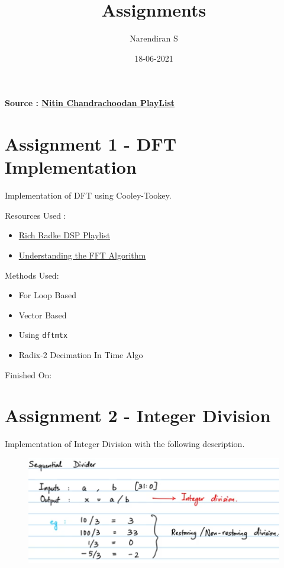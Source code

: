 \documentclass{article}
\title{Assignments}
\author{Narendiran S}
\begin{document}
\Large
\maketitle
\textbf{Source : \href{https://youtube.com/playlist?list=PLco7dux9L7g1RrB8TqUVCMEeu86D7azeg}{Nitin Chandrachoodan PlayList}}

\section{Assignment 1 - DFT Implementation}
Implementation of DFT using Cooley-Tookey.


Resources Used :
\begin{itemize}
    \item \href{https://youtube.com/playlist?list=PLuh62Q4Sv7BUSzx5Jr8Wrxxn-U10qG1et}{Rich Radke DSP Playlist}
    \item \href{https://jakevdp.github.io/blog/2013/08/28/understanding-the-fft/}{Understanding the FFT Algorithm}
\end{itemize}


Methods Used:
\begin{itemize}
    \item For Loop Based
    \item Vector Based
    \item Using \verb|dftmtx|
    \item Radix-2 Decimation In Time Algo
\end{itemize}

Finished On: \date{18-06-2021}



\section{Assignment 2 - Integer Division}
Implementation of Integer Division with the following description.
\begin{figure}[H]
    \centering
    \includegraphics[scale=0.4]{Resources/Images/Assignment2_Desc.png}
\end{figure}
\end{document}
